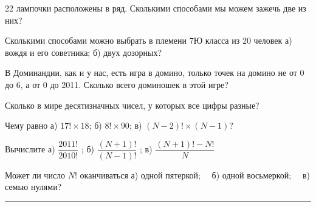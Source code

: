\begin{thm}
	22 лампочки расположены в ряд. Сколькими способами мы можем зажечь две из них?
\end{thm}

\begin{thm}	
	Сколькими способами можно выбрать в племени 7Ю класса из 20 человек а) вождя и его советника; б) двух дозорных?
\end{thm}

\begin{thm}	
	В Доминандии, как и у нас, есть игра в домино, только точек на домино не от 0 до 6, а от 0 до 2011. Сколько всего доминошек в этой игре?
\end{thm}

\begin{thm}	
	Сколько в мире десятизначных чисел, у которых все цифры разные?
\end{thm}

\begin{thm}	
	Чему равно а) $17!\times 18$;  б) $8!\times 90$;  в) $(N - 2)!\times (N - 1)$?
\end{thm}

\begin{thm}\label{3.4}
	Вычислите а) $\dfrac{2011!}{2010!}$ ;  б) $\dfrac{(N+1)!}{(N-1)!}$ ; в)  $\dfrac{(N+1)!-N!}{N}$
\end{thm}


\begin{thm}	\label{3.5}
	Может ли число $N!$ оканчиваться а) одной пятеркой;~~ б) одной восьмеркой;~~ в) семью нулями?
\end{thm}

\hrule
